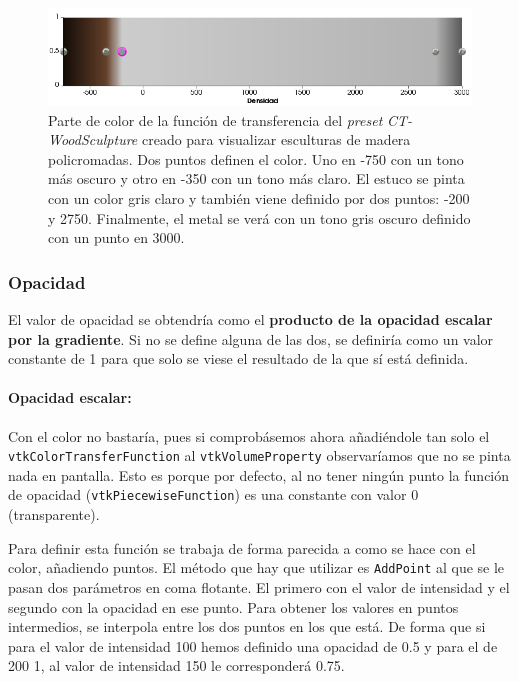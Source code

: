 \begin{figure}[H]
	\centering
	\includegraphics[width=12.5cm]{imagenes/color_tf}
	\caption{Parte de color de la función de transferencia del \textit{preset} \textit{CT-WoodSculpture} creado para visualizar esculturas de madera policromadas. Dos puntos definen el color. Uno en -750 con un tono más oscuro y otro en -350 con un tono más claro. El estuco se pinta con un color gris claro y también viene definido por dos puntos: -200 y 2750. Finalmente, el metal se verá con un tono gris oscuro definido con un punto en 3000.}
	\label{fig:color_tf}
\end{figure}

\subsubsection{Opacidad}

El valor de opacidad se obtendría como el \textbf{producto de la opacidad escalar por la gradiente}. Si no se define alguna de las dos, se definiría como un valor constante de 1 para que solo se viese el resultado de la que sí está definida.

\paragraph{\textbf{Opacidad escalar:}} Con el color no bastaría, pues si comprobásemos ahora añadiéndole tan solo el \texttt{vtkColorTransferFunction} al \texttt{vtkVolumeProperty} observaríamos que no se pinta nada en pantalla. Esto es porque por defecto, al no tener ningún punto la función de opacidad (\texttt{vtkPiecewiseFunction}) es una constante con valor 0 (transparente). 

Para definir esta función se trabaja de forma parecida a como se hace con el color, añadiendo puntos. El método que hay que utilizar es \texttt{AddPoint} al que se le pasan dos parámetros en coma flotante. El primero con el valor de intensidad y el segundo con la opacidad en ese punto. Para obtener los valores en puntos intermedios, se interpola entre los dos puntos en los que está. De forma que si para el valor de intensidad 100 hemos definido una opacidad de 0.5 y para el de 200 1, al valor de intensidad 150 le corresponderá 0.75.

